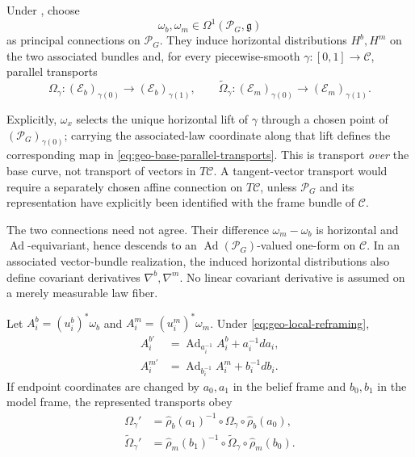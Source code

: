 Under , choose
\begin{equation}
\omega_b,\omega_m\in\Omega^1(\mathscr P_G,\mathfrak g)
\label{eq:geo-principal-connections}
\end{equation}
as principal connections on $\mathscr P_G$.  They induce horizontal distributions $H^b,H^m$ on the two
associated bundles and, for every piecewise-smooth $\gamma:[0,1]\to\mathcal C$, parallel
transports
\begin{equation}
\Omega_\gamma:
(\mathcal E_b)_{\gamma(0)}\longrightarrow(\mathcal E_b)_{\gamma(1)},
\qquad
\widetilde\Omega_\gamma:
(\mathcal E_m)_{\gamma(0)}\longrightarrow(\mathcal E_m)_{\gamma(1)}.
\label{eq:geo-base-parallel-transports}
\end{equation}

Explicitly, $\omega_x$ selects the unique horizontal lift of $\gamma$ through a chosen point of
$(\mathscr P_G)_{\gamma(0)}$; carrying the associated-law coordinate along that lift defines the corresponding
map in \eqref{eq:geo-base-parallel-transports}.  This is transport \emph{over} the base curve, not
transport of vectors in $T\mathcal C$.  A tangent-vector transport would require a separately
chosen affine connection on $T\mathcal C$, unless $\mathscr P_G$ and its representation have explicitly been
identified with the frame bundle of $\mathcal C$.

The two connections need not agree.  Their difference $\omega_m-\omega_b$ is horizontal and
$\operatorname{Ad}$-equivariant, hence descends to an
$\operatorname{Ad}(\mathscr P_G)$-valued one-form on $\mathcal C$.  In an associated vector-bundle
realization, the induced horizontal distributions also define covariant derivatives
$\nabla^b,\nabla^m$.  No linear covariant derivative is assumed on a merely measurable law fiber.

Let $A_i^b=(u_i^b)^*\omega_b$ and $A_i^m=(u_i^m)^*\omega_m$.  Under
\eqref{eq:geo-local-reframing},
\begin{align}
A_i^{b\prime}
&=\operatorname{Ad}_{a_i^{-1}}A_i^b+a_i^{-1}da_i,
\label{eq:geo-local-connection-b}\\
A_i^{m\prime}
&=\operatorname{Ad}_{b_i^{-1}}A_i^m+b_i^{-1}db_i.
\label{eq:geo-local-connection-m}
\end{align}
If endpoint coordinates are changed by $a_0,a_1$ in the belief frame and $b_0,b_1$ in the model
frame, the represented transports obey
\begin{align}
\Omega_\gamma'
&=\widehat\rho_b(a_1)^{-1}\circ\Omega_\gamma\circ\widehat\rho_b(a_0),
\label{eq:geo-pt-gauge-b}\\
\widetilde\Omega_\gamma'
&=\widehat\rho_m(b_1)^{-1}\circ\widetilde\Omega_\gamma\circ\widehat\rho_m(b_0).
\label{eq:geo-pt-gauge-m}
\end{align}

